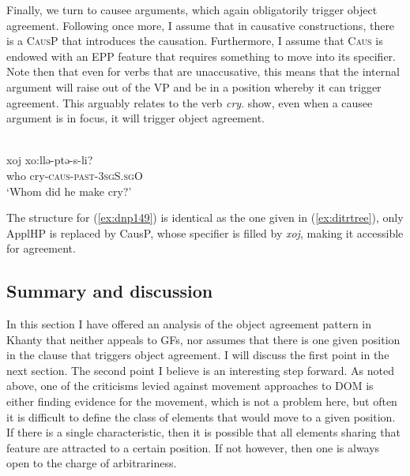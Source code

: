 \documentclass[output=paper
,modfonts
,nonflat]{langsci/langscibook}
\begin{document}
\noindent Finally, we turn to causee arguments, which again obligatorily trigger object agreement.
Following \citet{pylkkanen2008} once more, I assume that in causative constructions, there is a \textsc{CausP} that introduces the causation.
Furthermore, I assume that \textsc{Caus} is endowed with an EPP feature that requires something to move into its specifier. Note then that even for verbs that are unaccusative, this means that the internal argument will raise out of the VP and be in a position whereby it can trigger agreement. This arguably relates to the verb \emph{cry}. \citeauthor{dn2011} show, even when a causee argument is in focus, it will trigger object agreement. 

\begin{exe}
\ex \citet[][149]{dn2011} \label{ex:dnp149}\\
{\gll xoj xo:llə-ptə-s-li?\\
who cry-\textsc{caus-past-3sgS.sgO}\\
\glt `Whom did he make cry?'}
\end{exe}

\noindent The structure for (\ref{ex:dnp149}) is identical as the one given in (\ref{ex:ditrtree}), only ApplHP is replaced by CausP, whose specifier is filled by \emph{xoj}, making it accessible for agreement.

\subsection{Summary and discussion}

In this section I have offered an analysis of the object agreement pattern in Khanty that neither appeals to GFs, nor assumes that there is one given position in the clause that triggers object agreement. 
I will discuss the first point in the next section.
The second point I believe is an interesting step forward. 
As noted above, one of the criticisms levied against movement approaches to DOM is either finding evidence for the movement, which is not a problem here, but often it is difficult to define the class of elements that would move to a given position. 
If there is a single characteristic, then it is possible that all elements sharing that feature are attracted to a certain position.
If not however, then one is always open to the charge of arbitrariness.
\end{document}
